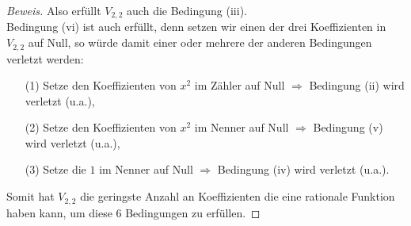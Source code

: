 \documentclass[a4paper]{article}
\begin{document}
\begin{proof}[Beweis]
    Also erfüllt $V_{2,2}$ auch die Bedingung (iii). \\
    Bedingung (vi) ist auch erfüllt, denn setzen wir einen der drei Koeffizienten in $V_{2,2}$ auf Null, 
    so würde damit einer oder mehrere der anderen Bedingungen verletzt werden: 
    \begin{enumerate}
        \item[(1)] Setze den Koeffizienten von $x^2$ im Zähler auf Null $\Longrightarrow$ Bedingung (ii) wird verletzt (u.a.),
        \item[(2)] Setze den Koeffizienten von $x^2$ im Nenner auf Null $\Longrightarrow$ Bedingung (v) wird verletzt (u.a.),
        \item[(3)] Setze die $1$ im Nenner auf Null $\Longrightarrow$ Bedingung (iv) wird verletzt (u.a.).
    \end{enumerate}

    Somit hat $V_{2,2}$ die 
    geringste Anzahl an Koeffizienten die eine rationale Funktion haben kann, um diese 6 Bedingungen zu erfüllen.
\end{proof}
\end{document}
